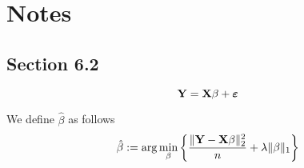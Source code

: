 \chapter{Notes}
\section{Section 6.2}
\begin{equation}
    \label{def: linear model (matrix)}
    \mathbf{Y} = \mathbf{X} \beta + \boldsymbol{\varepsilon}
\end{equation}

We define $\hat \beta$ as follows
\begin{equation}
    \label{not: beta hat}
    \hat{\beta}:=\arg \min _{\beta}\left\{\frac{\|\mathbf{Y}-\mathbf{X} \beta\|_{2}^{2}}{n}+\lambda\|\beta\|_{1}\right\}
\end{equation}


